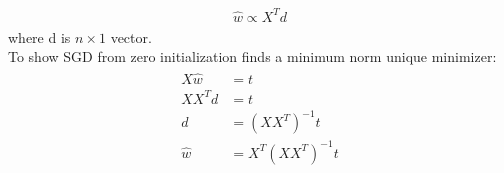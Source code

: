 \documentclass{myhw}
\begin{document}
\begin{homeworkProblem}
\begin{homeworkSection}
\begin{gather*}
\begin{aligned}
\hat{w} \propto X^T d
\end{aligned}
\end{gather*}
where d is $n \times 1$ vector. \\
To show SGD from zero initialization finds a minimum norm unique minimizer: 
\begin{gather*}
\begin{aligned}
X\hat{w} &= t \\
X X^T d &= t \\
d &= (XX^T)^{-1} t \\
\hat{w} &= X^T (XX^T)^{-1} t
\end{aligned}
\end{gather*}
\end{homeworkSection}
\end{homeworkProblem}
\end{document}
